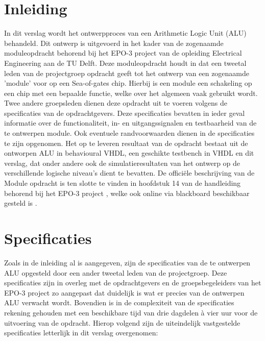\documentclass[11pt,twoside,a4paper]{article}
\begin{document}
\section{Inleiding}
In dit verslag wordt het ontwerpproces van een Arithmetic Logic Unit (ALU) behandeld. Dit ontwerp is uitgevoerd in het kader van de zogenaamde moduleopdracht behorend bij het EPO-3 project van de opleiding Electrical Engineering aan de TU Delft. Deze moduleopdracht houdt in dat een tweetal leden van de projectgroep opdracht geeft tot het ontwerp van een zogenaamde 'module' voor op een Sea-of-gates chip. Hierbij is een module een schakeling op een chip met een bepaalde functie, welke over het algemeen vaak gebruikt wordt. Twee andere groepsleden dienen deze opdracht uit te voeren volgens de specificaties van de opdrachtgevers. Deze specificaties bevatten in ieder geval informatie over de functionaliteit, in- en uitgangssignalen en testbaarheid van de te ontwerpen module. Ook eventuele randvoorwaarden dienen in de specificaties te zijn opgenomen. Het op te leveren resultaat van de opdracht bestaat uit de ontworpen ALU in behavioural VHDL, een geschikte testbench in VHDL en dit verslag, dat onder andere ook de simulatieresultaten van het ontwerp op de verschillende logische niveau's dient te bevatten. De offici\"ele beschrijving van de Module opdracht is ten slotte te vinden in hoofdstuk 14 van de handleiding behorend bij het EPO-3 project \cite{Handleiding}, welke ook online via blackboard beschikbaar gesteld is \cite{Handleiding_bb}.

\section{Specificaties}
Zoals in de inleiding al is aangegeven, zijn de specificaties van de te ontwerpen ALU opgesteld door een ander tweetal leden van de projectgroep. Deze specificaties zijn in overleg met de opdrachtgevers en de groepsbegeleiders van het EPO-3 project zo aangepast dat duidelijk is wat er precies van de ontwerpen ALU verwacht wordt. Bovendien is in de complexiteit van de specificaties rekening gehouden met een beschikbare tijd van drie dagdelen \`a vier uur voor de uitvoering van de opdracht. Hierop volgend zijn de uiteindelijk vastgestelde specificaties letterlijk in dit verslag overgenomen:

\end{document}
